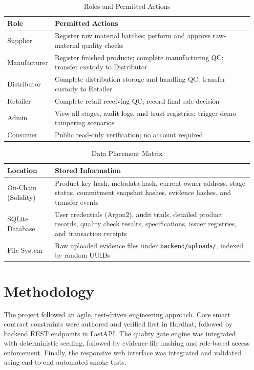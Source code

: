 \documentclass[12pt,a4paper]{report}
\begin{document}
\begin{table}[H]
\centering
\caption{Roles and Permitted Actions}
\label{tab:roles}
\small
\renewcommand{\arraystretch}{1.22}
\begin{tabularx}{\textwidth}{L{3.2cm} Y}
\toprule
\textbf{Role} & \textbf{Permitted Actions} \\
\midrule
Supplier & Register raw material batches; perform and approve raw-material quality checks \\
Manufacturer & Register finished products; complete manufacturing QC; transfer custody to Distributor \\
Distributor & Complete distribution storage and handling QC; transfer custody to Retailer \\
Retailer & Complete retail receiving QC; record final sale decision \\
Admin & View all stages, audit logs, and trust registries; trigger demo tampering scenarios \\
Consumer & Public read-only verification; no account required \\
\bottomrule
\end{tabularx}
\end{table}

\begin{table}[H]
\centering
\caption{Data Placement Matrix}
\label{tab:dataplc}
\small
\renewcommand{\arraystretch}{1.22}
\begin{tabularx}{\textwidth}{L{4.0cm} Y}
\toprule
\textbf{Location} & \textbf{Stored Information} \\
\midrule
On-Chain (Solidity) & Product key hash, metadata hash, current owner address, stage status, commitment snapshot hashes, evidence hashes, and transfer events \\
SQLite Database & User credentials (Argon2), audit trails, detailed product records, quality check results, specifications, issuer registries, and transaction receipts \\
File System & Raw uploaded evidence files under \texttt{backend/uploads/}, indexed by random UUIDs \\
\bottomrule
\end{tabularx}
\end{table}

\section{Methodology}
The project followed an agile, test-driven engineering approach. Core smart contract constraints were authored and verified first in Hardhat, followed by backend REST endpoints in FastAPI. The quality gate engine was integrated with deterministic seeding, followed by evidence file hashing and role-based access enforcement. Finally, the responsive web interface was integrated and validated using end-to-end automated smoke tests.
\clearpage
\end{document}
